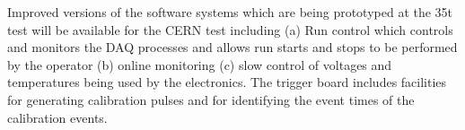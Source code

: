 Improved versions of the software systems which are being prototyped at the 
35t test will be available for the CERN test including (a) Run control which 
controls and monitors the DAQ processes and allows run starts and stops to
be performed by the operator (b) online monitoring (c) slow control of 
voltages and temperatures being used by the electronics. The trigger board includes facilities 
for generating calibration pulses and for identifying the event times of 
the calibration events.

